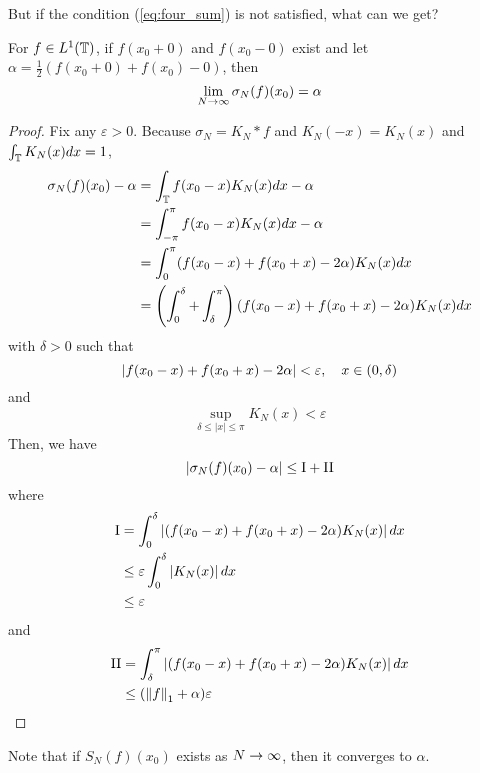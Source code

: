 \begin{enumerate}[label=\arabic*.]
	\noindent But if the condition (\ref{eq:four_sum}) is not satisfied, what can we get?
	\begin{thm}
		For $f \in L^1(\mathbb{T})$, if $f(x_0+0)$ and $f(x_0-0)$ exist and let $\alpha = \frac{1}{2}(f(x_0+0)+f(x_0)-0)$, then
		\begin{equation*}
			\lim_{N \rightarrow \infty}\sigma_N(f)(x_0) = \alpha
		\end{equation*}
	\end{thm}
	\begin{proof}
		Fix any $\varepsilon > 0$. Because $\sigma_N = K_N * f$ and $K_N(-x) = K_N(x)$ and $\int_{\mathbb{T}}K_N(x)dx = 1$,
		\begin{equation*}
			\begin{aligned}
				\sigma_N(f)(x_0) - \alpha &= \int_{\mathbb{T}} f(x_0-x)K_N(x)dx - \alpha \\ 
				&= \int_{-\pi}^\pi f(x_0-x)K_N(x)dx - \alpha \\
				&= \int_{0}^\pi (f(x_0-x)+f(x_0+x)-2\alpha)K_N(x)dx \\
				&= \left(\int_0^\delta + \int_\delta^\pi\right)(f(x_0-x)+f(x_0+x)-2\alpha)K_N(x)dx 
			\end{aligned}
		\end{equation*}
		with $\delta > 0$ such that
		\begin{equation*}
			\left\lvert f(x_0-x)+f(x_0+x)-2\alpha\right\lvert < \varepsilon,\quad x \in (0,\delta)
		\end{equation*}
		and 
		\begin{equation*}
			\sup _{\delta \leq|x| \leq \pi} K_N(x) < \varepsilon
		\end{equation*}
		Then, we have
		\begin{equation*}
			\abs{\sigma_N(f)(x_0) - \alpha} \leq \text{\RNum{1}} + \text{\RNum{2}}
		\end{equation*}
		where
		\begin{equation*}
			\begin{aligned}
				\text{\RNum{1}} &= \int_0^\delta \abs{(f(x_0-x)+f(x_0+x)-2\alpha)K_N(x)}dx \\
				&\leq \varepsilon\int_0^\delta \abs{K_N(x)}dx \\
				&\leq \varepsilon
			\end{aligned}
		\end{equation*}
		and
		\begin{equation*}
			\begin{aligned}
				\text{\RNum{2}} &= \int_\delta^\pi \abs{(f(x_0-x)+f(x_0+x)-2\alpha)K_N(x)}dx \\
				&\leq (\norm{f}_1+ \alpha)\varepsilon
			\end{aligned}
		\end{equation*}
	\end{proof}
	Note that if $S_N(f)(x_0)$ exists as $N \rightarrow \infty$, then it converges to $\alpha$.


\end{enumerate}
